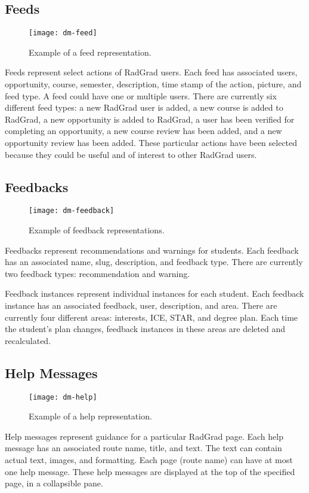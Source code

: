 \subsection{Feeds}
\begin{figure}[h]
\centering
\texttt{[image: dm-feed]}
\caption{Example of a feed representation.}
\end{figure}
Feeds represent select actions of RadGrad users. Each feed has associated users, opportunity, course, semester, description, time stamp of the action, picture, and feed type. A feed could have one or multiple users. There are currently six different feed types: a new RadGrad user is added, a new course is added to RadGrad, a new opportunity is added to RadGrad, a user has been verified for completing an opportunity, a new course review has been added, and a new opportunity review has been added. These particular actions have been selected because they could be useful and of interest to other RadGrad users.

\subsection{Feedbacks}
\begin{figure}[h]
\centering
\texttt{[image: dm-feedback]}
\caption{Example of feedback representations.}
\end{figure}
Feedbacks represent recommendations and warnings for students. Each feedback has an associated name, slug, description, and feedback type. There are currently two feedback types: recommendation and warning. 

Feedback instances represent individual instances for each student. Each feedback instance has an associated feedback, user, description, and area. There are currently four different areas: interests, ICE, STAR, and degree plan. Each time the student's plan changes, feedback instances in these areas are deleted and recalculated.

\subsection{Help Messages}
\begin{figure}[h]
\centering
\texttt{[image: dm-help]}
\caption{Example of a help representation.}
\end{figure}
Help messages represent guidance for a particular RadGrad page. Each help message has an associated route name, title, and text. The text can contain actual text, images, and formatting. Each page (route name) can have at most one help message. These help messages are displayed at the top of the specified page, in a collapsible pane.  

